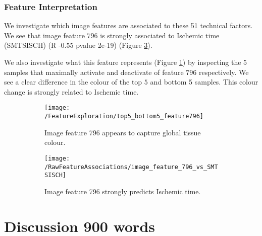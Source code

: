 \documentclass[graybox]{svmult}
\begin{document}
 


\subsubsection{Feature Interpretation}

We investigate which image features are associated to these 51 technical factors. We see that image feature $796$ is strongly associated to Ischemic time (SMTSISCH) (R -0.55 pvalue 2e-19) (Figure \ref{fig:image_feature_796_vs_SMTSISCH}).

We also investigate what this feature represents (Figure \ref{fig:top5_bottom5_feature796}) by inspecting the 5 samples that maximally activate and deactivate of feature $796$ respectively. We see a clear difference in the colour of the top $5$ and bottom 5 samples. This colour change is strongly related to Ischemic time.

\begin{figure}[H]
\begin{subfigure}{0.7\textwidth}
    \centering
    \texttt{[image: /FeatureExploration/top5\_bottom5\_feature796]}
    \caption{Image feature 796 appears to capture global tissue colour.}
    \label{fig:top5_bottom5_feature796}
\end{subfigure}
\begin{subfigure}{0.3\textwidth}
    \centering
    \texttt{[image: /RawFeatureAssociations/image\_feature\_796\_vs\_SMTSISCH]}
    \caption{Image feature 796 strongly predicts Ischemic time.}
    \label{fig:image_feature_796_vs_SMTSISCH}
 \end{subfigure}
 \caption{ }
\end{figure}



\section{Discussion 900 words}
\end{document}
